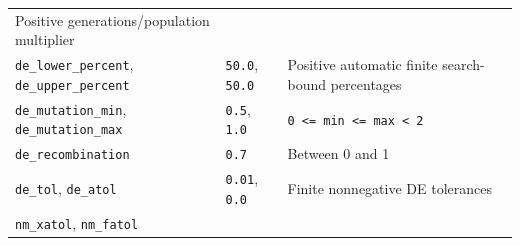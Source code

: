 \documentclass[
  10pt,
  a4paper,
  oneside]{scrreprt}
\begin{document}
\begin{longtable}[]{@{}lll@{}}
\begin{minipage}[t]{0.30\columnwidth}
Positive generations/population multiplier\strut
\end{minipage}\tabularnewline
\begin{minipage}[t]{0.30\columnwidth}\raggedright
\texttt{de\_lower\_percent}, \texttt{de\_upper\_percent}\strut
\end{minipage} & \begin{minipage}[t]{0.30\columnwidth}\raggedright
\texttt{50.0}, \texttt{50.0}\strut
\end{minipage} & \begin{minipage}[t]{0.30\columnwidth}\raggedright
Positive automatic finite search-bound percentages\strut
\end{minipage}\tabularnewline
\begin{minipage}[t]{0.30\columnwidth}\raggedright
\texttt{de\_mutation\_min}, \texttt{de\_mutation\_max}\strut
\end{minipage} & \begin{minipage}[t]{0.30\columnwidth}\raggedright
\texttt{0.5}, \texttt{1.0}\strut
\end{minipage} & \begin{minipage}[t]{0.30\columnwidth}\raggedright
\texttt{0\ \textless{}=\ min\ \textless{}=\ max\ \textless{}\ 2}\strut
\end{minipage}\tabularnewline
\begin{minipage}[t]{0.30\columnwidth}\raggedright
\texttt{de\_recombination}\strut
\end{minipage} & \begin{minipage}[t]{0.30\columnwidth}\raggedright
\texttt{0.7}\strut
\end{minipage} & \begin{minipage}[t]{0.30\columnwidth}\raggedright
Between 0 and 1\strut
\end{minipage}\tabularnewline
\begin{minipage}[t]{0.30\columnwidth}\raggedright
\texttt{de\_tol}, \texttt{de\_atol}\strut
\end{minipage} & \begin{minipage}[t]{0.30\columnwidth}\raggedright
\texttt{0.01}, \texttt{0.0}\strut
\end{minipage} & \begin{minipage}[t]{0.30\columnwidth}\raggedright
Finite nonnegative DE tolerances\strut
\end{minipage}\tabularnewline
\begin{minipage}[t]{0.30\columnwidth}\raggedright
\texttt{nm\_xatol}, \texttt{nm\_fatol}\strut
\end{minipage} & \begin{minipage}[t]{0.30\columnwidth}\raggedright

\end{minipage}
\end{longtable}
\end{document}
